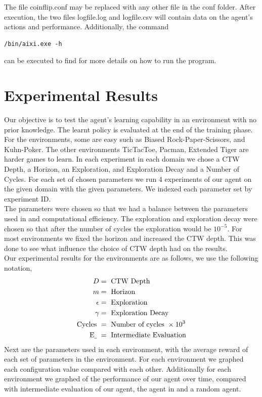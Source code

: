 \documentclass{article}
\theoremstyle{definition}
\newtheorem{primary statistics}[definition]{Primary Statistics}
\newtheorem{auxiliary statistics}[definition]{Auxiliary Statistics}
\begin{document}
The file coinflip.conf may be replaced with any other file in the conf folder. 
After execution, the two files logfile.log and logfile.csv will contain data on the agent’s actions and performance.
Additionally, the command
\begin{lstlisting}[style=DOS]
/bin/aixi.exe -h
\end{lstlisting}
can be executed to find for more details on how to run the program.




\section{Experimental Results}

Our objective is to test the agent's learning capability in an environment with no prior knowledge. The learnt policy is evaluated at the end of the training phase. For the environments, some are easy such as Biased Rock-Paper-Scissors, and Kuhn-Poker. The other environments TicTacToe, Pacman, Extended Tiger are harder games to learn. In each experiment in each domain we chose a CTW Depth, a Horizon, an Exploration, and Exploration Decay and a Number of Cycles. For each set of chosen parameters we run 4 experiments of our agent on the given domain with the given parameters. We indexed each parameter set by experiment ID. \\

The parameters were chosen so that we had a balance between the parameters used in \citep{veness2011monte} and computational efficiency. The exploration and exploration decay were chosen so that after the number of cycles the exploration would be $10^{-5}$. For most environments we fixed the horizon and increased the CTW depth. This was done to see what influence the choice of CTW depth had on the results. \\

Our experimental results for the environments are as follows, we use the following notation,
 \begin{align*}
     D &= \text{ CTW Depth} \\
     m &= \text{ Horizon} \\
     \epsilon &= \text{ Exploration} \\
     \gamma &= \text{ Exploration Decay} \\
     \text{Cycles } &= \text{ Number of cycles } \times 10^3 \\
     \text{E\underline{ } } &= \text{ Intermediate Evaluation}
 \end{align*}
Next are the parameters used in each environment, with the average reward of each set of parameters in the environment. For each environment we graphed each configuration value compared with each other. Additionally for each environment we graphed of the performance of our agent over time, compared with intermediate evaluation of our agent, the agent in \citep{veness2011monte} and a random agent.
\end{document}
